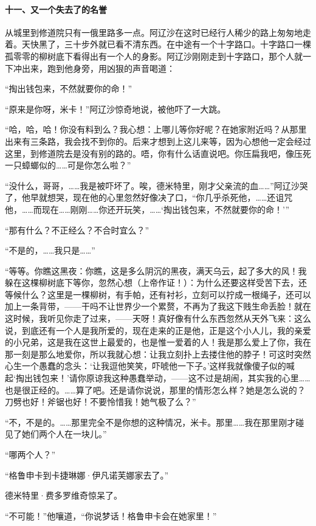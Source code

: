 \paragraph*{十一、又一个失去了的名誉}
\par 从城里到修道院只有一俄里路多一点。阿辽沙在这时已经行人稀少的路上匆匆地走着。天快黑了，三十步外就已看不清东西。在中途有一个十字路口。十字路口一棵孤零零的柳树底下看得出有一个人的身影。阿辽沙刚刚走到十字路口，那个人就一下冲出来，跑到他身旁，用凶狠的声音喝道：
\par “掏出钱包来，不然就要你的命！”
\par “原来是你呀，米卡！”阿辽沙惊奇地说，被他吓了一大跳。
\par “哈，哈，哈！你没有料到么？我心想：上哪儿等你好呢？在她家附近吗？从那里出来有三条路，我会找不到你的。后来才想到上这儿来等，因为心想他一定会经过这里，到修道院去是没有别的路的。唔，你有什么话直说吧。你压扁我吧，像压死一只蟑螂似的……可是你怎么啦？”
\par “没什么，哥哥，……我是被吓坏了。唉，德米特里，刚才父亲流的血……”阿辽沙哭了，他早就想哭，现在他的心里忽然好像决了口，“你几乎杀死他，……还诅咒他，……而现在……刚刚……你还开玩笑，……‘掏出钱包来，不然就要你的命！’”
\par “那有什么？不正经么？不合时宜么？”
\par “不是的，……我只是……”
\par “等等。你瞧这黑夜：你瞧，这是多么阴沉的黑夜，满天乌云，起了多大的风！我躲在这棵柳树底下等你，忽然心想（上帝作证！）：为什么还要这样受苦下去，还等候什么？这里是一棵柳树，有手帕，还有衬衫，立刻可以拧成一根绳子，还可以加上一条背带，——干吗不让世界少一个累赘，不再为了我这下贱生命丢脸！就在这时候，我听见你走了过来，——天呀！真好像有什么东西忽然从天外飞来：这么说，到底还有一个人是我所爱的，现在走来的正是他，正是这个小人儿，我的亲爱的小兄弟，这是我在这世上最爱的，也是惟一爱着的人！我是那么爱上了你，我在那一刻是那么地爱你，所以我就心想：让我立刻扑上去搂住他的脖子！可这时突然心生一个愚蠢的念头：‘让我逗他笑笑，吓唬他一下子。’这样我就像傻子似的喊起‘掏出钱包来！’请你原谅我这种愚蠢举动，——这不过是胡闹，其实我的心里……也是很正经的。……算了吧。还是请你说说，那里的情形怎么样？她是怎么说的？刀劈也好！斧锯也好！不要怜惜我！她气极了么？”
\par “不，不是的。……那里完全不是你想的这种情况，米卡。那里……我在那里刚才碰见了她们两个人在一块儿。”
\par “哪两个人？”
\par “格鲁申卡到卡捷琳娜·伊凡诺芙娜家去了。”
\par 德米特里·费多罗维奇惊呆了。
\par “不可能！”他嚷道，“你说梦话！格鲁申卡会在她家里！”
